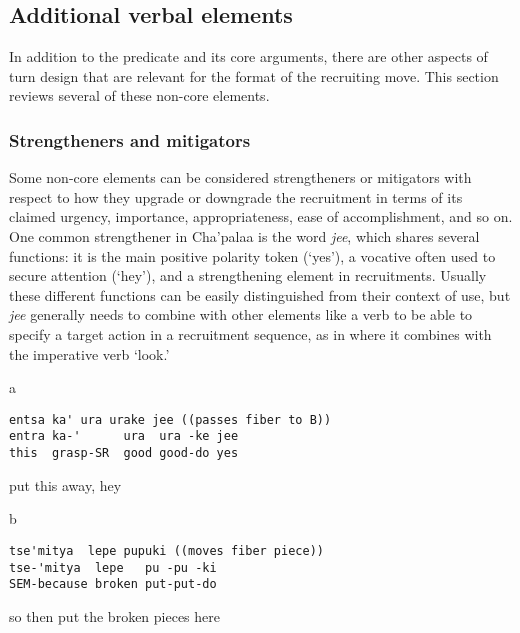 \documentclass[output=paper]{langsci/langscibook}
\begin{document}
\subsection{Additional verbal elements}\label{sec:floyd:3.4}

In addition to the predicate and its core arguments, there are other aspects of turn design that are relevant for the format of the recruiting move. This section reviews several of these non-core elements.

\subsubsection{Strengtheners and mitigators}\label{sec:floyd:3.4.1}

Some non-core elements can be considered strengtheners or mitigators with respect to how they upgrade or downgrade the recruitment in terms of its claimed urgency, importance, appropriateness, ease of accomplishment, and so on. One common strengthener in Cha’palaa is the word \textit{jee}, which shares several functions: it is the main positive polarity token (‘yes’), a vocative often used to secure attention (‘hey’), and a strengthening element in recruitments. Usually these different functions can be easily distinguished from their context of use, but \textit{jee} generally needs to combine with other elements like a verb to be able to specify a target action in a recruitment sequence, as in  where it combines with the imperative verb ‘look.’

\newpage
{}\vspace{-1mm}
%
\begin{mdframednoverticalspace}[style=firstfoc]
\begin{transbox}{1}{a}
\begin{verbatim}
entsa ka' ura urake jee ((passes fiber to B))
entra ka-'      ura  ura -ke jee
this  grasp-SR  good good-do yes
\end{verbatim}
put this away, hey
\end{transbox}
\end{mdframednoverticalspace}
%
\begin{mdframednoverticalspace}[style=secondfoc]
\begin{transbox}{2}{b}
\begin{verbatim}
tse'mitya  lepe pupuki ((moves fiber piece))
tse-'mitya  lepe   pu -pu -ki
SEM-because broken put-put-do
\end{verbatim}
so then put the broken pieces here
\end{transbox}
\end{mdframednoverticalspace}\bigskip
\end{document}
